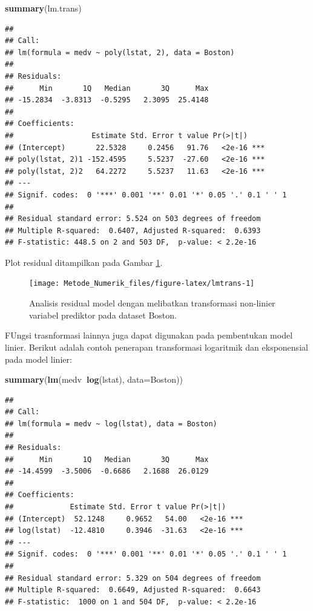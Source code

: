 \documentclass[]{book}
\newenvironment{Shaded}{\begin{snugshade}}{\end{snugshade}}
\newcommand{\DataTypeTok}[1]{\textcolor[rgb]{0.13,0.29,0.53}{#1}}
\newcommand{\KeywordTok}[1]{\textcolor[rgb]{0.13,0.29,0.53}{\textbf{#1}}}
\newcommand{\NormalTok}[1]{#1}
\newcommand{\OperatorTok}[1]{\textcolor[rgb]{0.81,0.36,0.00}{\textbf{#1}}}
\theoremstyle{definition}
\theoremstyle{definition}
\theoremstyle{definition}
\theoremstyle{remark}
\begin{document}
\begin{Shaded}
\begin{Highlighting}[]
\KeywordTok{summary}\NormalTok{(lm.trans)}
\end{Highlighting}
\end{Shaded}

\begin{verbatim}
## 
## Call:
## lm(formula = medv ~ poly(lstat, 2), data = Boston)
## 
## Residuals:
##      Min       1Q   Median       3Q      Max 
## -15.2834  -3.8313  -0.5295   2.3095  25.4148 
## 
## Coefficients:
##                  Estimate Std. Error t value Pr(>|t|)    
## (Intercept)       22.5328     0.2456   91.76   <2e-16 ***
## poly(lstat, 2)1 -152.4595     5.5237  -27.60   <2e-16 ***
## poly(lstat, 2)2   64.2272     5.5237   11.63   <2e-16 ***
## ---
## Signif. codes:  0 '***' 0.001 '**' 0.01 '*' 0.05 '.' 0.1 ' ' 1
## 
## Residual standard error: 5.524 on 503 degrees of freedom
## Multiple R-squared:  0.6407, Adjusted R-squared:  0.6393 
## F-statistic: 448.5 on 2 and 503 DF,  p-value: < 2.2e-16
\end{verbatim}

Plot residual ditampilkan pada Gambar \ref{fig:lmtrans}.

\begin{figure}

{\centering \texttt{[image: Metode\_Numerik\_files/figure-latex/lmtrans-1]} 

}

\caption{Analisis residual model dengan melibatkan transformasi non-linier variabel prediktor pada dataset Boston.}\label{fig:lmtrans}
\end{figure}

FUngsi trasnformasi lainnya juga dapat digunakan pada pembentukan model linier. Berikut adalah contoh penerapan transformasi logaritmik dan eksponensial pada model linier:

\begin{Shaded}
\begin{Highlighting}[]
\KeywordTok{summary}\NormalTok{(}\KeywordTok{lm}\NormalTok{(medv}\OperatorTok{~}\KeywordTok{log}\NormalTok{(lstat), }\DataTypeTok{data=}\NormalTok{Boston))}
\end{Highlighting}
\end{Shaded}

\begin{verbatim}
## 
## Call:
## lm(formula = medv ~ log(lstat), data = Boston)
## 
## Residuals:
##      Min       1Q   Median       3Q      Max 
## -14.4599  -3.5006  -0.6686   2.1688  26.0129 
## 
## Coefficients:
##             Estimate Std. Error t value Pr(>|t|)    
## (Intercept)  52.1248     0.9652   54.00   <2e-16 ***
## log(lstat)  -12.4810     0.3946  -31.63   <2e-16 ***
## ---
## Signif. codes:  0 '***' 0.001 '**' 0.01 '*' 0.05 '.' 0.1 ' ' 1
## 
## Residual standard error: 5.329 on 504 degrees of freedom
## Multiple R-squared:  0.6649, Adjusted R-squared:  0.6643 
## F-statistic:  1000 on 1 and 504 DF,  p-value: < 2.2e-16
\end{verbatim}
\end{document}
